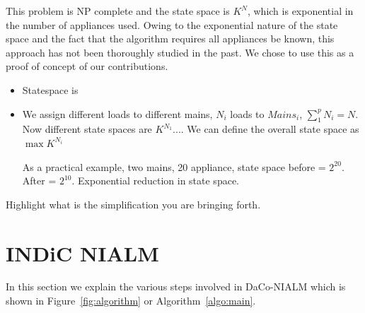 \documentclass[conference]{IEEEtran}
\newcommand{\figref}[1]{Figure~\ref{#1}}
\newcommand{\algoref}[1]{Algorithm~\ref{#1}}
\begin{document}
This problem is NP complete and the state space is $K^N$, which is exponential in the number of appliances used. Owing to the exponential nature of the state space and the fact that the algorithm requires all appliances be known, this approach has not been thoroughly studied in the past. We chose to use this as a proof of concept of our contributions.

\begin{itemize}
\item Statespace is 
\item We assign different loads to different mains, $N_i$ loads to $Mains_i$, $\sum\limits_{1}^{p}{N_i}=N$. Now different state spaces are
$K^{N_1}$.... We can define the overall state space as $\max{K^{N_i}}$

As a practical example, two mains, 20 appliance, state space before = $2^{20}$. After = $2^{10}$. Exponential reduction in state space.
\end{itemize}

Highlight what is the simplification you are bringing forth.

\section{INDiC NIALM}
In this section we explain the various steps involved in DaCo-NIALM which is shown in \figref{fig:algorithm} or \algoref{algo:main}.
\end{document}
